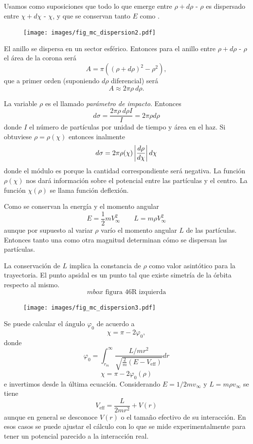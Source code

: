 \documentclass[10pt,oneside]{CBFT_book}
\begin{document}
Usamos como suposiciones que todo lo que emerge entre $\rho + d\rho$ - $\rho$  es dispersado entre
$\chi + d\chi$ - $\chi$, y que se conservan tanto $E$ como .

\begin{figure}[htb]
	\begin{center}
	\texttt{[image: images/fig\_mc\_dispersion2.pdf]}	 
	\end{center}
	\caption{}
\end{figure}

El anillo se dispersa en un sector esférico. Entonces para el anillo entre $\rho + d\rho$ - $\rho$ el
área de la corona será
\[
	A =  \pi ( (\rho + d\rho)^2 - \rho^2 ),
\]
que a primer orden (suponiendo $d\rho$ diferencial) será 
\[
	A \approx 2 \pi \rho \: d\rho.
\]

La variable $\rho$ es el llamado {\it parámetro de impacto}. Entonces
\[
	d\sigma = \frac{  2 \pi \rho \: d\rho I}{I} = 2 \pi \rho d\rho
\]
donde $I$ el número de partículas por unidad de tiempo y área
en el haz. Si obtuviese $ \rho = \rho(\chi) $ entonces inalmente
\[
	d\sigma =  2 \pi \rho(\chi) \left| \frac{d^{\hspace{-0.05em}} {\rho}}{d {\chi}^{\hspace{-0.05em}}} \right| d\chi
\]
donde el módulo es porque la cantidad correspondiente será negativa. La función $\rho(\chi)$ nos dará
información sobre el potencial entre las partículas y el centro.
La función $\chi(\rho)$ se llama función deflexión.

Como se conservan la energía y el momento angular
\[
	E = \frac{1}{2} m V_\infty^2 \qquad L = m \rho V_\infty^2 
\]
aunque por supuesto al variar $\rho$ varío el momento angular $L$ de las partículas. Entonces tanto una
como otra magnitud determinan cómo se dispersan las partículas.

La conservación de $L$ implica la constancia de $\rho$ como valor asintótico para la trayectoria. El punto
apsidal es un punto tal que existe simetría de la órbita respecto al mismo.
\[
	mbox{ \text{ figura 46R izquierda} }
\]
\begin{figure}[htb]
	\begin{center}
	\texttt{[image: images/fig\_mc\_dispersion3.pdf]}	 
	\end{center}
	\caption{}
\end{figure}

Se puede calcular el ángulo $\varphi_0$ de acuerdo a 
\[
	\chi = \pi - 2\varphi_0,
\]
donde
\[
	\varphi_0 = \int_{r_m}^{\infty} \frac{L/mr^2}{\sqrt{\frac{2}{m}(E - V_{\text{eff}} )}} dr
\]
\[
	\chi = \pi - 2 \varphi_0 (\rho)
\]
e invertimos desde la última ecuación. Considerando $E = 1/2 m v_\infty$ y $ L = m \rho v_\infty $
se tiene 
\[
	V_{\text{eff}} = \frac{L}{2 m r^2} + V(r)
\]
aunque en general se desconoce $V(r)$ o el tamaño efectivo de su interacción. En esos casos se puede 
ajustar el cálculo con lo que se mide experimentalmente para tener un potencial parecido a la interacción
real.
\end{document}
